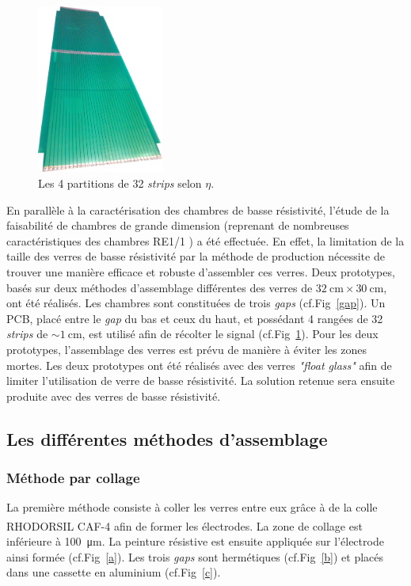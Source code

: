 \begin{figure}
	\vspace*{-1cm}
	\centering
	\includegraphics[width=0.37\textwidth]{GLA/strips.jpg}
	\caption{Les \num{4} partitions de \num{32} \textit{strips} selon $\eta$.}
	\label{strips}
\end{figure}

En parallèle à la caractérisation des chambres de basse résistivité, l'étude de la faisabilité de chambres de grande dimension (reprenant de nombreuses caractéristiques des chambres RE1/1 \cite{gapss}) a été effectuée. En effet, la limitation de la taille des verres de basse résistivité par la méthode de production nécessite de trouver une manière efficace et robuste d'assembler ces verres.  Deux prototypes, basés sur deux méthodes d'assemblage différentes des verres de $\SI{32}{\centi\meter}\times\SI{30}{\centi\meter}$, ont été réalisés. Les chambres sont constituées de trois \textit{gaps} (cf.Fig~\ref{gap}). Un PCB, placé entre le \textit{gap} du bas et ceux du haut, et possédant \num{4} rangées de \num{32} \textit{strips} de $\sim\SI{1}{\centi\meter}$, est utilisé afin de récolter le signal (cf.Fig~\ref{strips}). Pour les deux prototypes, l'assemblage des verres est prévu de manière à éviter les zones mortes. Les deux prototypes ont été réalisés avec des verres \textit{"float glass"} afin de limiter l'utilisation de verre de basse résistivité. La solution retenue sera ensuite produite avec des verres de basse résistivité.

\subsection{Les différentes méthodes d'assemblage} 
\subsubsection{Méthode par collage}
La première méthode consiste à coller les verres entre eux grâce à de la colle RHODORSIL\textsuperscript{\textregistered}
 CAF-4 afin de former les électrodes. La zone de collage est inférieure à \SI{100}{\micro\meter}. La peinture résistive est ensuite appliquée sur l'électrode ainsi formée (cf.Fig~\ref{a}). Les trois \textit{gaps} sont hermétiques (cf.Fig~\ref{b}) et placés dans une cassette en aluminium (cf.Fig~\ref{c}).
 
